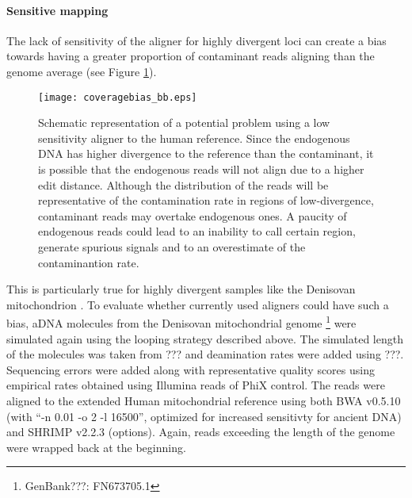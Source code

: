 \documentclass[a4paper,12pt]{article}
\begin{document}

\noindent \paragraph{Sensitive mapping}

The lack of sensitivity of the aligner for highly divergent loci can create a bias towards having a greater proportion of contaminant reads aligning than the genome average (see Figure \ref{fig:coveragebias}). 


\begin{figure}[H]
\centering
\texttt{[image: coveragebias\_bb.eps]}
\caption{Schematic representation of a potential problem using a low sensitivity aligner to the human reference. Since the endogenous DNA has higher divergence to the reference than the contaminant, it is possible that the endogenous reads will not align due to a higher edit distance. Although the distribution of the reads will be representative of the contamination rate in regions of low-divergence, contaminant reads may overtake endogenous ones. A paucity of endogenous reads could lead to an inability to call certain region, generate spurious signals and to an overestimate of the contaminantion rate.}
\label{fig:coveragebias}
\end{figure}



This is particularly true for highly divergent samples like the Denisovan mitochondrion \cite{krause2010complete}.  To evaluate whether currently used aligners could have such a bias, aDNA molecules from the Denisovan mitochondrial genome \footnote{GenBank???: FN673705.1} were simulated again using the looping strategy described above. The simulated length of the molecules was taken from ??? and deamination rates were added using ???. Sequencing errors were added along with representative quality scores using empirical rates obtained using Illumina reads of PhiX control. The reads were aligned to the extended Human mitochondrial reference using both BWA v0.5.10 (with ``-n 0.01 -o 2 -l 16500'', optimized for increased sensitivty for ancient DNA) and SHRIMP v2.2.3\cite{david2011shrimp2} (options). Again, reads exceeding the length of the genome were wrapped back at the beginning. 



\end{document}
